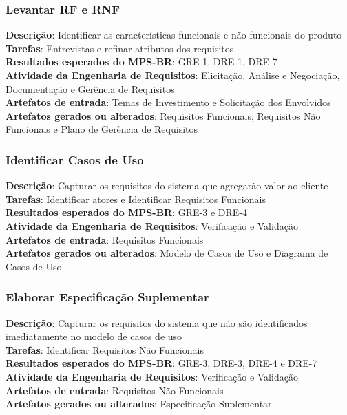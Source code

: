 \subsubsection{Levantar RF e RNF}

\textbf{Descrição}: Identificar as características funcionais e não funcionais do produto\\
\textbf{Tarefas}: Entrevistas e refinar atributos dos requisitos\\
\textbf{Resultados esperados do MPS-BR}: GRE-1, DRE-1, DRE-7\\
\textbf{Atividade da Engenharia de Requisitos}:  Elicitação, Análise e Negociação, Documentação e Gerência de Requisitos\\
\textbf{Artefatos de entrada}: Temas de Investimento e Solicitação dos Envolvidos\\
\textbf{Artefatos gerados ou alterados}: Requisitos Funcionais, Requisitos Não Funcionais e Plano de Gerência de Requisitos

\subsubsection{Identificar Casos de Uso}

\textbf{Descrição}: Capturar os requisitos do sistema que agregarão valor ao cliente\\
\textbf{Tarefas}: Identificar atores e Identificar Requisitos Funcionais\\
\textbf{Resultados esperados do MPS-BR}: GRE-3 e DRE-4\\
\textbf{Atividade da Engenharia de Requisitos}: Verificação e Validação\\
\textbf{Artefatos de entrada}: Requisitos Funcionais\\
\textbf{Artefatos gerados ou alterados}: Modelo de Casos de Uso e Diagrama de Casos de Uso

\subsubsection{Elaborar Especificação Suplementar}

\textbf{Descrição}: Capturar os requisitos do sistema que não são identificados imediatamente no modelo de casos de uso\\
\textbf{Tarefas}: Identificar Requisitos Não Funcionais\\
\textbf{Resultados esperados do MPS-BR}: GRE-3, DRE-3, DRE-4 e DRE-7\\
\textbf{Atividade da Engenharia de Requisitos}: Verificação e Validação\\
\textbf{Artefatos de entrada}: Requisitos Não Funcionais\\
\textbf{Artefatos gerados ou alterados}: Especificação Suplementar

